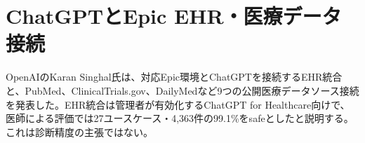 \section{ChatGPTとEpic EHR・医療データ接続}
OpenAIのKaran Singhal氏は、対応Epic環境とChatGPTを接続するEHR統合と、PubMed、ClinicalTrials.gov、DailyMedなど9つの公開医療データソース接続を発表した。EHR統合は管理者が有効化するChatGPT for Healthcare向けで、医師による評価では27ユースケース・4,363件の99.1\%をsafeとしたと説明する。これは診断精度の主張ではない。
